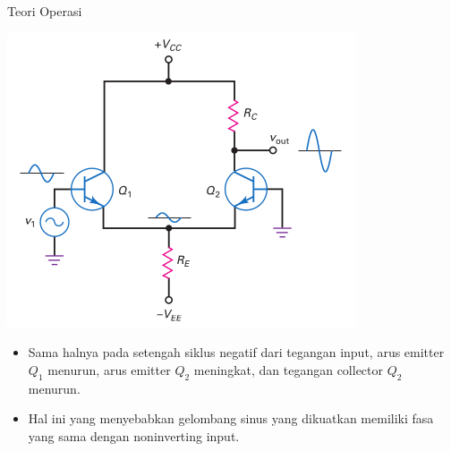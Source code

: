 \documentclass[aspectratio=169]{beamer}
\begin{document}
\begin{frame}{Teori Operasi}
	\begin{multicols}{2}
		\begin{center}
			\includegraphics[height=0.7\textheight]{gambar/01.diff-amp/01.noninverting-input+single-ended-output_AC}
		\end{center}
		\columnbreak
		\begin{itemize}
			\item Sama halnya pada setengah siklus negatif dari tegangan input, arus emitter $ Q_1 $ menurun, arus emitter $ Q_2 $ meningkat, dan tegangan collector $ Q_2 $ menurun.
			\item Hal ini yang menyebabkan gelombang sinus yang dikuatkan memiliki fasa yang sama dengan noninverting input.
		\end{itemize}
	\end{multicols}
\end{frame}
\end{document}
